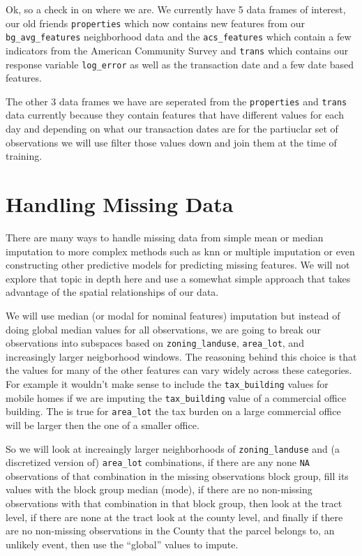 \documentclass[]{book}
\theoremstyle{definition}
\theoremstyle{definition}
\theoremstyle{definition}
\theoremstyle{remark}
\begin{document}
Ok, so a check in on where we are. We currently have 5 data frames of
interest, our old friends \texttt{properties} which now contains new
features from our \texttt{bg\_avg\_features} neighborhood data and the
\texttt{acs\_features} which contain a few indicators from the American
Community Survey and \texttt{trans} which contains our response variable
\texttt{log\_error} as well as the transaction date and a few date based
features.

The other 3 data frames we have are seperated from the
\texttt{properties} and \texttt{trans} data currently because they
contain features that have different values for each day and depending
on what our transaction dates are for the partiuclar set of observations
we will use filter those values down and join them at the time of
training.

\section{Handling Missing Data}\label{handling-missing-data}

There are many ways to handle missing data from simple mean or median
imputation to more complex methods such as knn or multiple imputation or
even constructing other predictive models for predicting missing
features. We will not explore that topic in depth here and use a
somewhat simple approach that takes advantage of the spatial
relationships of our data.

We will use median (or modal for nominal features) imputation but
instead of doing global median values for all observations, we are going
to break our observations into subspaces based on
\texttt{zoning\_landuse}, \texttt{area\_lot}, and increasingly larger
neigborhood windows. The reasoning behind this choice is that the values
for many of the other features can vary widely across these categories.
For example it wouldn't make sense to include the \texttt{tax\_building}
values for mobile homes if we are imputing the \texttt{tax\_building}
value of a commercial office building. The is true for
\texttt{area\_lot} the tax burden on a large commercial office will be
larger then the one of a smaller office.

So we will look at increaingly larger neighborhoods of
\texttt{zoning\_landuse} and (a discretized version of)
\texttt{area\_lot} combinations, if there are any none \texttt{NA}
observations of that combination in the missing observations block
group, fill its values with the block group median (mode), if there are
no non-missing observations with that combination in that block group,
then look at the tract level, if there are none at the tract look at the
county level, and finally if there are no non-missing observations in
the County that the parcel belongs to, an unlikely event, then use the
``global'' values to impute.
\end{document}
